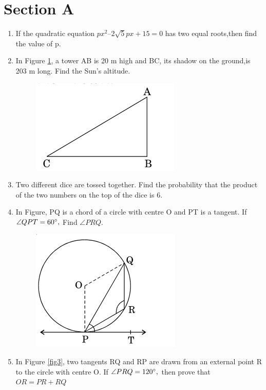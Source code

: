 \documentclass[journal,12pt,twocolumn]{IEEEtran}
\renewcommand\thesection{\arabic{section}}
\begin{document}
\section{Section A}
\renewcommand{\theequation}{\theenumi}
\begin{enumerate}[label=\thesection.\arabic*.,ref=\thesection.\theenumi]
\item If the quadratic equation $px^2 – 2 \sqrt{5} px + 15 = 0 $ has two equal roots,then find the value of p.
\item In Figure \ref{fig1}, a tower AB is 20 m high and BC, its shadow on the ground,is 203 m long. Find the Sun’s altitude.
\begin{figure}[h!]
	\centering
    \includegraphics[width=0.5\columnwidth,center]{./fig/image1.png}
	\caption{}
	\label{fig1}
\end{figure}
\item Two different dice are tossed together. Find the probability that the product of the two numbers on the top of the dice is 6.
\item In Figure, PQ is a chord of a circle with centre O and PT is a tangent. If $\angle QPT = 60 \degree,$ Find $\angle PRQ $.
\begin{figure}[h!]
	\centering
    \includegraphics[width=0.5\columnwidth,center]{./fig/image2.png}
	\caption{}
	\label{fig2}
\end{figure}
 \item In Figure \ref{fig3}, two tangents RQ and RP are drawn from an external point R to the circle with centre O. If $\angle PRQ = 120 \degree,$ then prove that $OR = PR + RQ $

\end{enumerate}
\end{document}
